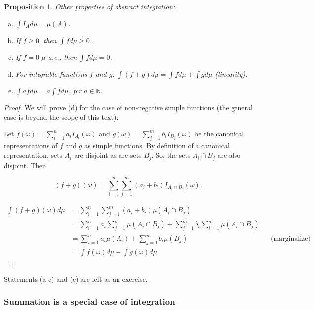\documentclass{book}
\theoremstyle{plain}%
\newtheorem{proposition}{Proposition}[section]
\theoremstyle{definition}
\begin{document}
\begin{proposition}

Other properties of abstract integration:

\begin{enumerate}[(a)]
\item $\int I_A d\mu = \mu(A)$.
\item If $f \geq 0$, then $\int f d\mu \geq 0$.
\item If $f = 0$ $\mu$-a.e., then $\int f d\mu = 0$.
\item For integrable functions $f$ and $g$: $\int (f + g) d\mu = \int f d\mu + \int g d\mu$ \emph{(linearity)}.
\item $\int afd\mu = a \int fd\mu$, for $a \in \mathbb{R}$.
\end{enumerate}\label{prop:abstract}
\end{proposition}

\begin{proof}
We will prove (d) for the case of non-negative simple functions (the general case is beyond the scope of this text):

Let $f(\omega) = \sum_{i=1}^n a_i I_{A_i}(\omega)$ and  $g(\omega) = \sum_{j=1}^m b_i I_{B_j}(\omega)$ be the canonical representations of $f$ and $g$ as simple functions. By definition of a canonical representation, sets $A_i$ are disjoint as are sets $B_j$. So, the sets $A_i \cap B_j$ are also disjoint. Then

$$(f + g)(\omega) = \sum_{i=1}^n \sum_{j=1}^m (a_i + b_i) I_{A_i \cap B_j}(\omega).$$

\begin{align*}
\int (f + g)(\omega) d\mu &= \sum_{i=1}^n \sum_{j=1}^m (a_i + b_i) \mu(A_i \cap B_j) \\
&= \sum_{i=1}^n a_i \sum_{j=1}^m  \mu(A_i \cap B_j) + \sum_{j=1}^m b_i \sum_{i=1}^n \mu(A_i \cap B_j)  \\
&= \sum_{i=1}^n a_i
 \mu(A_i) + \sum_{j=1}^m b_i \mu(B_j) && \text{(marginalize)} \\
&= \int f(\omega) d\mu + \int g(\omega) d\mu  
\end{align*}
\end{proof}

Statements (a-c) and (e) are left as an exercise.


\subsubsection*{Summation is a special case of integration}
\end{document}
